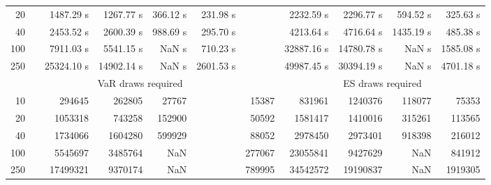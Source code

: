 {{\begin{longtable}{rr rrrr r rrrr}
20 & & 1487.29 s & 1267.77 s & 366.12 s & 231.98 s && 2232.59 s & 2296.77 s & 594.52 s & 325.63 s \\ 
40 & & 2453.52 s & 2600.39 s & 988.69 s & 295.70 s && 4213.64 s & 4716.64 s & 1435.19 s & 485.38 s \\ 
100 & & 7911.03 s & 5541.15 s &  NaN s & 710.23 s && 32887.16 s & 14780.78 s &  NaN s & 1585.08 s \\ 
250 & & 25324.10 s & 14902.14 s &  NaN s & 2601.53 s && 49987.45 s & 30394.19 s &  NaN s & 4701.18 s \\ 
\hline 
 && \multicolumn{4}{c}{VaR draws required} &&   \multicolumn{4}{c}{ES draws required} \\  \cline{3-6}  \cline{8-11} 
10 & & 294645 & 262805 & 27767 & & 15387 & 831961 & 1240376 & 118077  & 75353 \\ 
20 & & 1053318 & 743258 & 152900 & & 50592 & 1581417 & 1410016 & 315261  & 113565 \\ 
40 & & 1734066 & 1604280 & 599929 & & 88052 & 2978450 & 2973401 & 918398  & 216012 \\ 
100 & & 5545697 & 3485764 & NaN & & 277067 & 23055841 & 9427629 & NaN  & 841912 \\ 
250 & & 17499321 & 9370174 & NaN & & 789995 & 34542572 & 19190837 & NaN  & 1919305 \\ 
\hline 
\end{longtable} 
} 
} 
